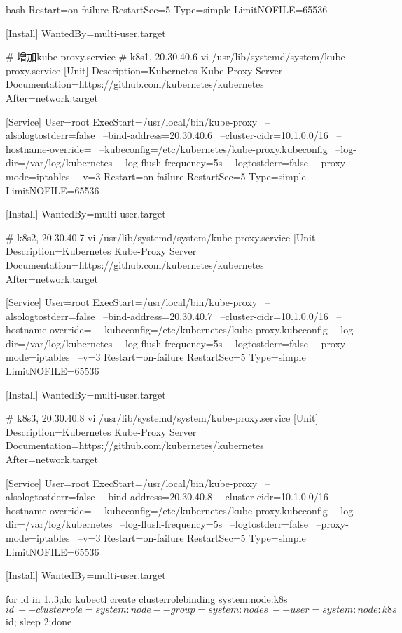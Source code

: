 \begin{outline}[enumerate]
\begin{code-block}{bash}
Restart=on-failure
RestartSec=5
Type=simple
LimitNOFILE=65536

[Install]
WantedBy=multi-user.target

# 增加kube-proxy.service
# k8s1, 20.30.40.6
vi /usr/lib/systemd/system/kube-proxy.service
[Unit]
Description=Kubernetes Kube-Proxy Server
Documentation=https://github.com/kubernetes/kubernetes
After=network.target

[Service]
User=root
ExecStart=/usr/local/bin/kube-proxy \
    --alsologtostderr=false \
    --bind-address=20.30.40.6 \
    --cluster-cidr=10.1.0.0/16 \
    --hostname-override= \
    --kubeconfig=/etc/kubernetes/kube-proxy.kubeconfig \
    --log-dir=/var/log/kubernetes \
    --log-flush-frequency=5s \
    --logtostderr=false \
    --proxy-mode=iptables \
    --v=3
Restart=on-failure
RestartSec=5
Type=simple
LimitNOFILE=65536

[Install]
WantedBy=multi-user.target

# k8s2, 20.30.40.7
vi /usr/lib/systemd/system/kube-proxy.service
[Unit]
Description=Kubernetes Kube-Proxy Server
Documentation=https://github.com/kubernetes/kubernetes
After=network.target

[Service]
User=root
ExecStart=/usr/local/bin/kube-proxy \
    --alsologtostderr=false \
    --bind-address=20.30.40.7 \
    --cluster-cidr=10.1.0.0/16 \
    --hostname-override= \
    --kubeconfig=/etc/kubernetes/kube-proxy.kubeconfig \
    --log-dir=/var/log/kubernetes \
    --log-flush-frequency=5s \
    --logtostderr=false \
    --proxy-mode=iptables \
    --v=3
Restart=on-failure
RestartSec=5
Type=simple
LimitNOFILE=65536

[Install]
WantedBy=multi-user.target

# k8s3, 20.30.40.8
vi /usr/lib/systemd/system/kube-proxy.service
[Unit]
Description=Kubernetes Kube-Proxy Server
Documentation=https://github.com/kubernetes/kubernetes
After=network.target

[Service]
User=root
ExecStart=/usr/local/bin/kube-proxy \
    --alsologtostderr=false \
    --bind-address=20.30.40.8 \
    --cluster-cidr=10.1.0.0/16 \
    --hostname-override= \
    --kubeconfig=/etc/kubernetes/kube-proxy.kubeconfig \
    --log-dir=/var/log/kubernetes \
    --log-flush-frequency=5s \
    --logtostderr=false \
    --proxy-mode=iptables \
    --v=3
Restart=on-failure
RestartSec=5
Type=simple
LimitNOFILE=65536

[Install]
WantedBy=multi-user.target

for id in {1..3};do kubectl create clusterrolebinding system:node:k8s$id \
    --clusterrole=system:node --group=system:nodes \
    --user=system:node:k8s$id; sleep 2;done


\end{code-block}
\end{outline}
